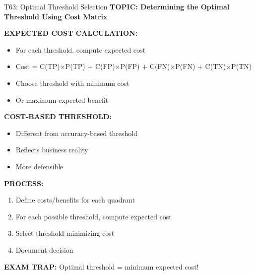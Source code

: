 \documentclass[8pt]{beamer}
\begin{document}
	\begin{frame}{T63: Optimal Threshold Selection}
		\fontsize{6.5}{7.5}\selectfont
		\textbf{TOPIC: Determining the Optimal Threshold Using Cost Matrix}
		
		\vspace{0.1cm}
		\textbf{EXPECTED COST CALCULATION:}
		\begin{itemize}
			\item For each threshold, compute expected cost
			\item Cost = C(TP)×P(TP) + C(FP)×P(FP) + C(FN)×P(FN) + C(TN)×P(TN)
			\item Choose threshold with minimum cost
			\item Or maximum expected benefit
		\end{itemize}
		
		\vspace{0.1cm}
		\textbf{COST-BASED THRESHOLD:}
		\begin{itemize}
			\item Different from accuracy-based threshold
			\item Reflects business reality
			\item More defensible
		\end{itemize}
		
		\vspace{0.1cm}
		\textbf{PROCESS:}
		\begin{enumerate}
			\item Define costs/benefits for each quadrant
			\item For each possible threshold, compute expected cost
			\item Select threshold minimizing cost
			\item Document decision
		\end{enumerate}
		
		\textcolor{myred}{\textbf{EXAM TRAP:}} Optimal threshold = \textcolor{myblue}{minimum expected cost}!
	\end{frame}
	
\end{document}
